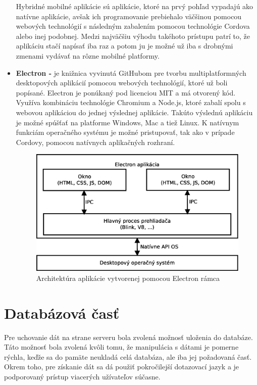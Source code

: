 \begin{itemize}
    Hybridné mobilné aplikácie sú aplikácie, ktoré na prvý pohľad vypadajú ako natívne aplikácie, avšak ich programovanie prebiehalo väčšinou pomocou webových technológií s následným zabalením pomocou technológie Cordova alebo inej podobnej. Medzi  najväčšiu výhodu takéhoto prístupu patrí to, že aplikáciu stačí napísať iba raz a potom ju je možné už iba s drobnými zmenami vydávať na rôzne mobilné platformy.\cite{0QSW9GoG0OTJ7FKM}
    \item \textbf{Electron -} je knižnica vyvinutá GitHubom pre tvorbu multiplatformných desktopových aplikácií pomocou webových technológií, ktoré už boli popísané. Electron je ponúkaný pod licenciou MIT a má otvorený kód. Využíva kombináciu technológie Chromium a Node.js, ktoré zabalí spolu s webovou aplikáciou do jednej výslednej aplikácie. Takúto výslednú aplikáciu je možné spúšťať na platforme Windows, Mac a tiež Linux. K natívnym funkciám operačného systému je možné pristupovať, tak ako v prípade Cordovy, pomocou natívnych aplikačných rozhraní. \cite{hBGbGXxiU66nJt51}
    \begin{figure}[h]
      \centering
      \includegraphics[scale=0.40]{fig/electron.eps}
      \caption{Architektúra aplikácie vytvorenej pomocou Electron rámca}
      \label{fig:electron}
    \end{figure}
\end{itemize}

\section{Databázová časť}
Pre uchovanie dát na strane serveru bola zvolená možnosť uloženia do databáze. Táto možnosť bola zvolená kvôli tomu, že manipulácia s dátami je pomerne rýchla, keďže sa do pamäte neukladá celá databáza, ale iba jej požadovaná časť. Okrem toho, pre získanie dát sa dá použiť pokročilejší dotazovací jazyk a je podporovaný prístup viacerých užívateľov súčasne. 

